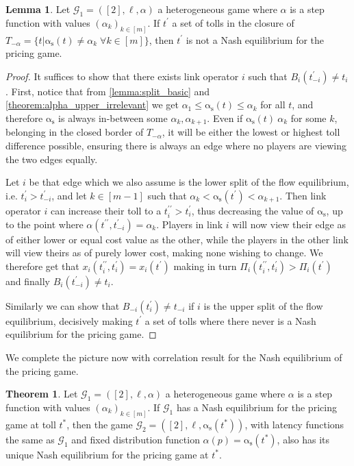 \documentclass[10pt,a4paper]{book}
\newcommand{\as}{\mathrm{\alpha_s}}
\newcommand{\Gm}{\mathcal{G}}
\theoremstyle{definition}
\newtheorem{theorem}[definition]{Theorem}
\newtheorem{lemma}[definition]{Lemma}
\theoremstyle{comment}
\begin{document}
\begin{lemma}
	\label{lemma:a_step_gaps}
	Let $\Gm_1 = ([2], \ell, \alpha)$ a heterogeneous game where $\alpha$ is a step function with values $(\alpha_k)_{k \in [m]}$.
	If $t^\prime$ a set of tolls in the closure of $T_{-\alpha} = \{t | \as(t) \ne \alpha_k \; \forall k \in [m]\}$, then $t^\prime$ is not a Nash equilibrium for the pricing game.
\end{lemma}

\begin{proof}
	It suffices to show that there exists link operator $i$ such that $B_i(t_{-i}^\prime) \ne t_i$.
	First, notice that from \ref{lemma:split_basic} and \ref{theorem:alpha_upper_irrelevant} we get $\alpha_1 \le \as(t) \le \alpha_k$ for all $t$, and therefore $\as$ is always in-between some $\alpha_k, \alpha_{k+1}$.
	Even if $\as(t) \ \alpha_k$ for some $k$, belonging in the closed border of $T_{-\alpha}$, it will be either the lowest or highest toll difference possible, ensuring there is always an edge where no players are viewing the two edges equally.

	Let $i$ be that edge which we also assume is the lower split of the flow equilibrium, i.e. $t_i^\prime > t_{-i}^\prime$, and let $k \in [m - 1]$ such that $\alpha_k < \as(t^\prime) < \alpha_{k+1}$.
	Then link operator $i$ can increase their toll to a $t_i^{\prime\prime} > t_i^\prime$, thus decreasing the value of $\as$, up to the point where $\alpha(t^{\prime\prime}, t_{-i}^\prime) = \alpha_k$.
	Players in link $i$ will now view their edge as of either lower or equal cost value as the other, while the players in the other link will view theirs as of purely lower cost, making none wishing to change.
	We therefore get that $x_i(t_i^{\prime\prime}, t_i^\prime) = x_i(t^\prime)$ making in turn $\Pi_i(t_i^{\prime\prime}, t_i^\prime) > \Pi_i(t^\prime)$ and finally $B_i(t_{-i}^\prime) \ne t_i$.

	Similarly we can show that $B_{-i}(t_i^\prime) \ne t_{-i}$ if $i$ is the upper split of the flow equilibrium, decisively making $t^\prime$ a set of tolls where there never is a Nash equilibrium for the pricing game.
\end{proof}

We complete the picture now with correlation result for the Nash equilibrium of the pricing game.

\begin{theorem}
	\label{theorem:a_step_ne_equiv_fixed}
	Let $\Gm_1 = ([2], \ell, \alpha)$ a heterogeneous game where $\alpha$ is a step function with values $(\alpha_k)_{k \in [m]}$.
	If $\Gm_1$ has a Nash equilibrium for the pricing game at toll $t^*$, then the game $\Gm_2 = ([2], \ell, \as(t^*))$, with latency functions the same as $\Gm_1$ and fixed distribution function $\alpha(p) = \as(t^*)$, also has its unique Nash equilibrium for the pricing game at $t^*$.
\end{theorem}
\end{document}
